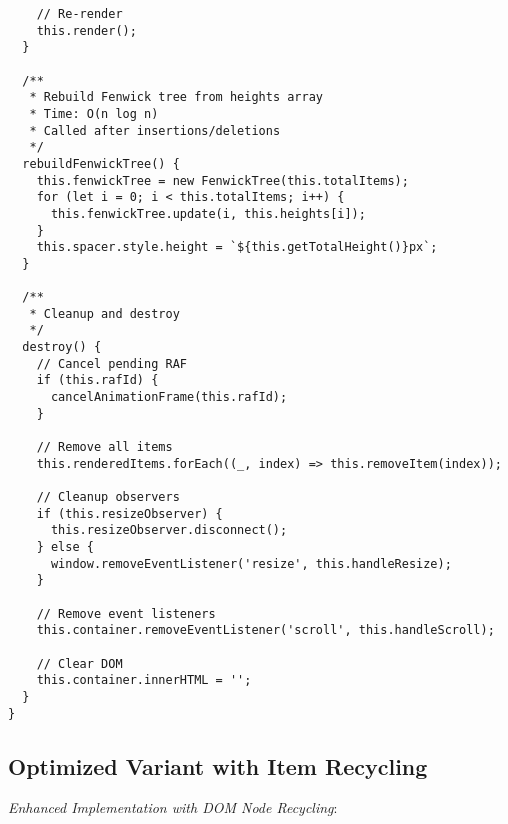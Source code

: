 \documentclass[11pt]{article}
\begin{document}
\begin{verbatim}
    // Re-render
    this.render();
  }
  
  /**
   * Rebuild Fenwick tree from heights array
   * Time: O(n log n)
   * Called after insertions/deletions
   */
  rebuildFenwickTree() {
    this.fenwickTree = new FenwickTree(this.totalItems);
    for (let i = 0; i < this.totalItems; i++) {
      this.fenwickTree.update(i, this.heights[i]);
    }
    this.spacer.style.height = `${this.getTotalHeight()}px`;
  }
  
  /**
   * Cleanup and destroy
   */
  destroy() {
    // Cancel pending RAF
    if (this.rafId) {
      cancelAnimationFrame(this.rafId);
    }
    
    // Remove all items
    this.renderedItems.forEach((_, index) => this.removeItem(index));
    
    // Cleanup observers
    if (this.resizeObserver) {
      this.resizeObserver.disconnect();
    } else {
      window.removeEventListener('resize', this.handleResize);
    }
    
    // Remove event listeners
    this.container.removeEventListener('scroll', this.handleScroll);
    
    // Clear DOM
    this.container.innerHTML = '';
  }
}
\end{verbatim}
\subsection{Optimized Variant with Item Recycling}
\label{sec:org2d09f0f}

\emph{Enhanced Implementation with DOM Node Recycling}:
\end{document}
